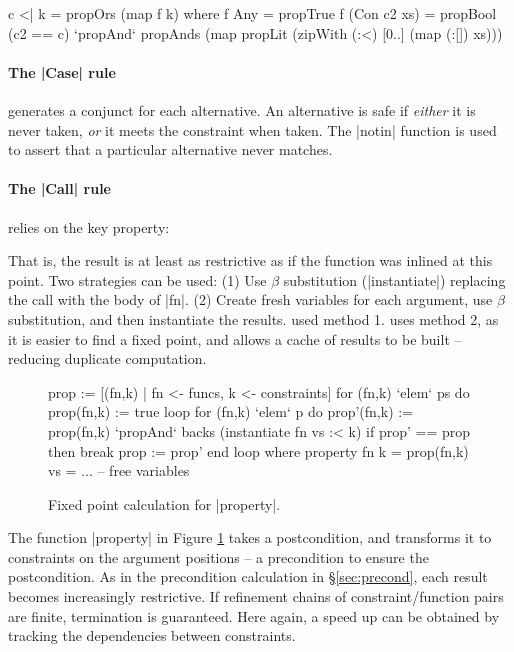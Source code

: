 \begin{code}
c <| k = propOrs (map f k)
    where
    f Any = propTrue
    f (Con c2 xs) = propBool (c2 == c) `propAnd`
        propAnds (map propLit (zipWith (:<) [0..] (map (:[]) xs)))
\end{code}

\paragraph{The |Case| rule} generates a conjunct for each alternative. An alternative is safe if \textit{either} it is never taken, \textit{or} it meets the constraint when taken. The |notin| function is used to assert that a particular alternative never matches.

\paragraph{The |Call| rule} relies on the key property:


That is, the result is at least as restrictive as if the function was inlined at this point. Two strategies can be used: (1) Use $\beta$ substitution (|instantiate|) replacing the call with the body of |fn|. (2) Create fresh variables for each argument, use $\beta$ substitution, and then instantiate the results. \oldtool{} used method 1. \newtool{} uses method 2, as it is easier to find a fixed point, and allows a cache of results to be built -- reducing duplicate computation.

\begin{figure}
\ignore\begin{code}
prop := [(fn,k) | fn <- funcs, k <- constraints]
for (fn,k) `elem` ps do prop(fn,k) := true
loop
    for (fn,k) `elem` p do
        prop'(fn,k) := prop(fn,k) `propAnd` backs (instantiate fn vs :< k)
    if prop' == prop then break
    prop := prop'
end loop
    where
        property fn k = prop(fn,k)
        vs = ... -- free variables
\end{code}
\caption{Fixed point calculation for |property|.}
\label{fig:property_fixp}
\end{figure}

The function |property| in Figure \ref{fig:property_fixp} takes a postcondition, and transforms it to constraints on the argument positions -- a precondition to ensure the postcondition. As in the precondition calculation in \S\ref{sec:precond}, each result becomes increasingly restrictive. If refinement chains of constraint/function pairs are finite, termination is guaranteed. Here again, a speed up can be obtained by tracking the dependencies between constraints.

